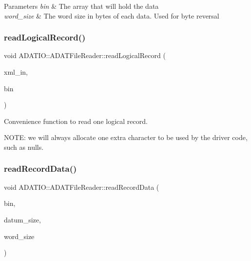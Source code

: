 \begin{DoxyParams}{Parameters}
{\em bin} & The array that will hold the data \\
\hline
{\em word\+\_\+size} & The word size in bytes of each data. Used for byte reversal \\
\hline
\end{DoxyParams}
\mbox{\label{classADATIO_1_1ADATFileReader_ga7d36d6dd7fef90986d0c435ddaa86eae}} 
\subsubsection{\texorpdfstring{readLogicalRecord()}{readLogicalRecord()}}
{\footnotesize\ttfamily void A\+D\+A\+T\+I\+O\+::\+A\+D\+A\+T\+File\+Reader\+::read\+Logical\+Record (\begin{DoxyParamCaption}\item[{\mbox{\hyperlink{classADATXML_1_1XMLReader}{X\+M\+L\+Reader}} \&}]{xml\+\_\+in,  }\item[{\mbox{\hyperlink{classXMLArray_1_1Array}{Array}}$<$ char $>$ \&}]{bin }\end{DoxyParamCaption})\hspace{0.3cm}{\ttfamily [protected]}}



Convenience function to read one logical record. 

N\+O\+TE\+: we will always allocate one extra character to be used by the driver code, such as nulls. \mbox{\label{classADATIO_1_1ADATFileReader_ga525c9902a7ee7ebe41c688897da0652e}} 
\subsubsection{\texorpdfstring{readRecordData()}{readRecordData()}}
{\footnotesize\ttfamily void A\+D\+A\+T\+I\+O\+::\+A\+D\+A\+T\+File\+Reader\+::read\+Record\+Data (\begin{DoxyParamCaption}\item[{void $\ast$}]{bin,  }\item[{int}]{datum\+\_\+size,  }\item[{int}]{word\+\_\+size }\end{DoxyParamCaption})\hspace{0.3cm}{\ttfamily [protected]}}



